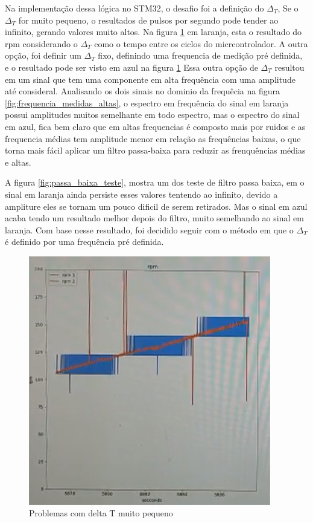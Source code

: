 Na implementação dessa lógica no STM32, o desafio foi a definição do $\Delta_{T}$,
Se o $\Delta_{T}$ for muito pequeno, o resultados de pulsos por segundo pode tender ao infinito, gerando valores muito altos.
Na figura \ref{fig:medidas_altas} em laranja, esta o resultado do rpm considerando o $\Delta_{T}$ como o tempo entre os ciclos do micrcontrolador.
A outra opção, foi definir um $\Delta_{T}$ fixo, definindo uma frequencia de medição pré definida, e o resultado pode ser visto em azul na figura \ref{fig:medidas_altas}
Essa outra opção de $\Delta_{T}$ resultou em um sinal que tem uma componente em alta frequência com uma amplitude até consideral.
Analisando os dois sinais no dominio da frequêcia na figura \ref{fig:frequencia_medidas_altas}, o espectro em frequência do sinal em laranja possui amplitudes muitos semelhante em todo espectro, mas o espectro do sinal em azul, fica bem claro que em altas frequencias é composto mais por ruidos
e as frequencia médias tem amplitude menor em relação as frequências baixas, o que torna mais fácil aplicar um filtro passa-baixa para reduzir as frenquências médias e altas.

A figura \ref{fig:passa_baixa_teste}, mostra um dos teste de filtro passa baixa, em o sinal em laranja ainda persiste esses valores tentendo ao infinito, devido a ampliture eles se tornam um pouco dificil de serem retirados.
Mas o sinal em azul acaba tendo um resultado melhor depois do filtro, muito semelhando ao sinal em laranja.
Com base nesse resultado, foi decidido seguir com o método em que o $\Delta_{T}$ é definido por uma frequência pré definida.


\begin{figure}[h]
    \centering
    \includegraphics{figures/medidas_altas}
    \caption{Problemas com delta T muito pequeno}
    \label{fig:medidas_altas}
\end{figure}

